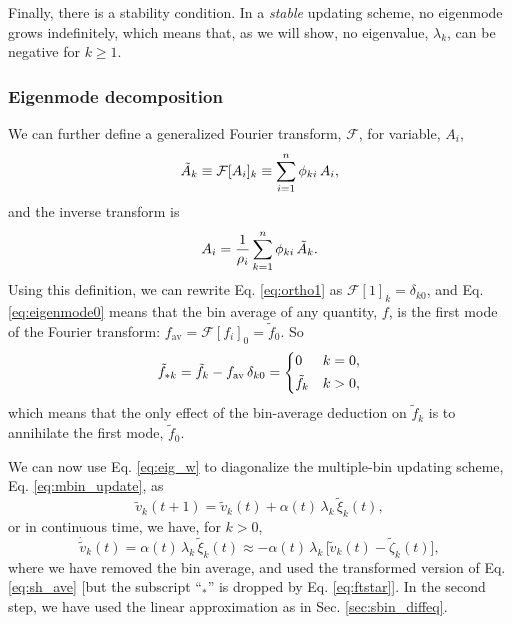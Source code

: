 \documentclass[reprint, superscriptaddress, floatfix]{revtex4-1}
\newcommand{\bav}[1]{#1_\mathrm{av}}
\begin{document}
Finally, there is a stability condition.
%
In a \emph{stable} updating scheme,
no eigenmode grows indefinitely,
which means that, as we will show, no eigenvalue, $\lambda_k$,
can be negative for $k \ge 1$.




\subsubsection{Eigenmode decomposition}



We can further define
a generalized Fourier transform, $\mathcal{F}$,
for variable, $A_i$,
%
\begin{equation}
  {\tilde A}_k
  \equiv \mathcal{F}[A_i]_k
  \equiv \sum_{i = 1}^n \phi_{ki} \, A_i
  ,
  \notag
\end{equation}
%
and the inverse transform is
%
\begin{equation}
  A_i =
  \frac{1}{\rho_i} \sum_{k = 1}^n \phi_{ki} \, \tilde{A}_k
  .
  \notag
\end{equation}
%
Using this definition,
we can rewrite Eq. \eqref{eq:ortho1} as
$\mathcal F[1]_k = \delta_{k0}$,
%
and Eq. \eqref{eq:eigenmode0} means that
the bin average of any quantity, $f$,
is the first mode of the Fourier transform:
$\bav{f}= \mathcal F[f_i]_0 = \tilde f_0$.
%
So
\begin{equation}
  \tilde f_{*k}
  = \tilde f_k - \bav{f} \, \delta_{k0}
  =
  \begin{dcases}
    0           & k = 0, \\
    \tilde f_k  & k > 0,
  \end{dcases}
  \label{eq:ftstar}
\end{equation}
%
which means that the only effect
of the bin-average deduction on $\tilde f_k$ is to
annihilate the first mode, $\tilde f_0$.


We can now use Eq. \eqref{eq:eig_w} to diagonalize
the multiple-bin updating scheme, Eq. \eqref{eq:mbin_update},
as
%
$$
{\tilde v}_k(t + 1) =
{\tilde v}_k(t) + \alpha(t) \, \lambda_k \,
{\tilde \xi}_k(t)
,
$$
or in continuous time, we have, for $k > 0$,
%
\begin{equation}
  \dot{\tilde v}_k(t)
  =
  \alpha(t) \, \lambda_k \, {\tilde \xi}_k(t)
  \approx
  -\alpha(t) \, \lambda_k \,
  \bigl[ {\tilde v}_k(t) - {\tilde \zeta}_k(t) \bigr]
  ,
  \label{eq:ut_diffeq_mbin}
\end{equation}
%
where we have removed the bin average,
and used the transformed version of Eq. \eqref{eq:sh_ave}
[but the subscript ``$_*$'' is dropped by Eq. \eqref{eq:ftstar}].
In the second step, we have used the linear approximation
as in Sec. \ref{sec:sbin_diffeq}.
\end{document}
